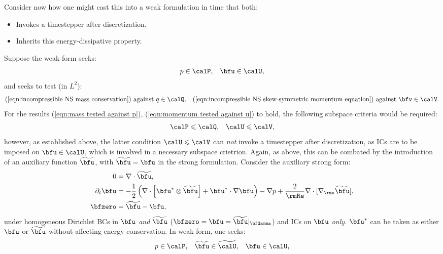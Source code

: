     Consider now how one might cast this into a weak formulation in time that both:
    \begin{itemize}
        \item  Invokes a timestepper after discretization.
        \item  Inherits this energy-dissipative property.
    \end{itemize}
    Suppose the weak form seeks:
    \begin{align}
           p  \in  \calP,  &&
        \bfu  \in  \calU,
    \end{align}
    and seeks to test (in $L^{2}$):
    \begin{align}
                           \text{(\ref{eqn:incompressible NS mass conservation}) against }    q \in \calQ,  &&
        \text{(\ref{eqn:incompressible NS skew-symmetric momentum equation}) against } \bfv \in \calV.
    \end{align}
    For the results (\ref{eqn:mass tested against p}), (\ref{eqn:momentum tested against u}) to hold, the following subspace criteria would be required:
    \begin{align}
        \calP  \leqslant  \calQ,  &&
        \calU  \leqslant  \calV,
    \end{align}
    however, as established above, the latter condition $\calU  \leqslant  \calV$ can \emph{not} invoke a timestepper after discretization, as ICs are to be imposed on $\bfu  \in  \calU$, which is involved in a necessary subspace crietrion. Again, as above, this can be combated by the introduction of an auxiliary function $\widetilde{\bfu}$, with $\widetilde{\bfu}  =  \bfu$ in the strong formulation. Consider the auxiliary strong form:
    \begin{align}
                       0  &=  \nabla\cdot\widetilde{\bfu},  \\
        \partial_{t}\bfu  &=  - \frac{1}{2}\left(\nabla\cdot\left[\bfu^{*}\otimes\widetilde{\bfu}\right] + \bfu^{*}\cdot\nabla\bfu\right) - \nabla p + \frac{2}{\rmRe}\nabla\cdot[\nabla_{\rms}\widetilde{\bfu}],  \\
                 \bfzero  &=  \widetilde{\bfu} - \bfu,
    \end{align}
    under homogeneous Dirichlet BCs in $\bfu$ \emph{and} $\widetilde{\bfu}$ ($\bfzero  =  \bfu  =  \widetilde{\bfu}|_{\bfGamma}$) and ICs on $\bfu$ \emph{only}. $\bfu^{*}$ can be taken as either $\bfu$ or $\widetilde{\bfu}$ without affecting energy conservation. In weak form, one seeks:
    \begin{align}
                       p  \in  \calP,  &&
        \widetilde{\bfu}  \in  \widetilde{\calU},  &&
                    \bfu  \in  \calU,
    \end{align}
